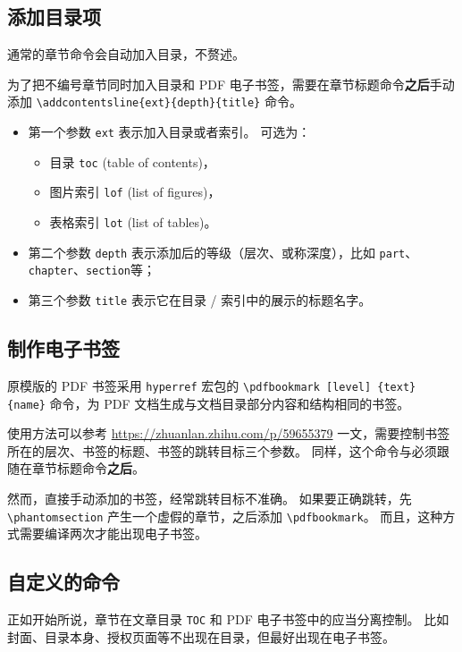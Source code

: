 \documentclass[../Main/thesis.tex]{subfiles}
\begin{document}
\subsection{添加目录项}

通常的章节命令会自动加入目录，不赘述。

为了把不编号章节同时加入目录和 PDF 电子书签，需要在章节标题命令\textbf{之后}手动添加 \texttt{\textbackslash{}addcontentsline\{ext\}\{depth\}\{title\}} 命令。

\begin{itemize}
    \item 第一个参数 \texttt{ext} 表示加入目录或者索引。 可选为：
    \begin{itemize}
        \item 目录 \texttt{toc} (table of contents)，
        \item 图片索引 \texttt{lof} (list of figures)，
        \item 表格索引 \texttt{lot} (list of tables)。
    \end{itemize}
    \item 第二个参数 \texttt{depth} 表示添加后的等级（层次、或称深度），比如 \texttt{part}、\texttt{chapter}、\texttt{section}等；
    \item 第三个参数 \texttt{title} 表示它在目录 / 索引中的展示的标题名字。
\end{itemize}

\subsection{制作电子书签}

原模版的 PDF 书签采用 \texttt{hyperref} 宏包的 \texttt{\textbackslash{}pdfbookmark [level] \{text\} \{name\}} 命令，为 PDF 文档生成与文档目录部分内容和结构相同的书签。

使用方法可以参考 \url{https://zhuanlan.zhihu.com/p/59655379} 一文，需要控制书签所在的层次、书签的标题、书签的跳转目标三个参数。
同样，这个命令与必须跟随在章节标题命令\textbf{之后}。

然而，直接手动添加的书签，经常跳转目标不准确。 如果要正确跳转，先 \texttt{\textbackslash{}phantomsection} 产生一个虚假的章节，之后添加 \texttt{\textbackslash{}pdfbookmark}。
而且，这种方式需要编译两次才能出现电子书签。

\subsection{自定义的命令}

正如开始所说，章节在文章目录 \texttt{TOC} 和 PDF 电子书签中的应当分离控制。
比如封面、目录本身、授权页面等不出现在目录，但最好出现在电子书签。
\end{document}
